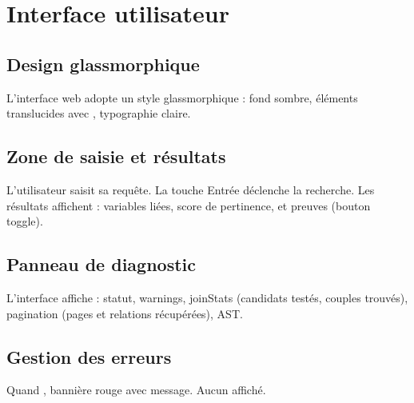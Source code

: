 \chapter{Interface utilisateur}
\label{chap:interface}

\section{Design glassmorphique}

L'interface web adopte un style glassmorphique : fond sombre, éléments translucides avec , typographie claire.

\section{Zone de saisie et résultats}

L'utilisateur saisit sa requête. La touche Entrée déclenche la recherche. Les résultats affichent : variables liées, score de pertinence, et preuves (bouton toggle).

\section{Panneau de diagnostic}

L'interface affiche : statut, warnings, joinStats (candidats testés, couples trouvés), pagination (pages et relations récupérées), AST.

\section{Gestion des erreurs}

Quand , bannière rouge avec message. Aucun  affiché.
